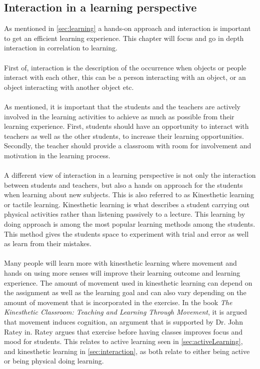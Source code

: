 \subsection{Interaction in a learning perspective}\label{sec:interaction} 
As mentioned in \autoref{sec:learning} a hands-on approach and interaction is important to get an efficient learning experience. This chapter will focus and go in depth  interaction in correlation to learning.\\
\\
First of, interaction is the description of the occurrence when objects or people interact with each other, this can be a person interacting with an object, or an object interacting with another object etc.\\
\\
As mentioned, it is important that the students and the teachers are actively involved in the learning activities to achieve as much as possible from their learning experience. First, students should have an opportunity to interact with teachers as well as the other students, to increase their learning opportunities. Secondly, the teacher should provide a classroom with room for involvement and motivation in the learning process\cite{interactionlearning}.\\
\\
A different view of interaction in a learning perspective is not only the interaction between students and teachers, but also a hands on approach for the students when learning about new subjects. This is also referred to as Kinesthetic learning or tactile learning. Kinesthetic learning is what describes a student carrying out physical activities rather than listening passively to a lecture. This learning by doing approach is among the most popular learning methods among the students. This method gives the students space to experiment with trial and error as well as learn from their mistakes.\cite{kinest} \\
\\
Many people will learn more with kinesthetic learning where movement and hands on using more senses will improve their learning outcome and learning experience. The amount of movement used in kinesthetic learning can depend on the assignment as well as the learning goal and can also vary depending on the amount of movement that is incorporated in the exercise.	In the book \textit{The Kinesthetic Classroom: Teaching and Learning Through Movement}\cite{kinestheticMovement}, it is argued that movement induces cognition, an argument that is supported by Dr. John Ratey in\cite{rateySpark}. Ratey argues that exercise before having classes improves focus and mood for students\cite[p.~33]{rateySpark}. This relates to active learning seen in \autoref{sec:activeLearning}, and kinesthetic learning in \autoref{sec:interaction}, as both relate to either being active or being physical doing learning.\\

